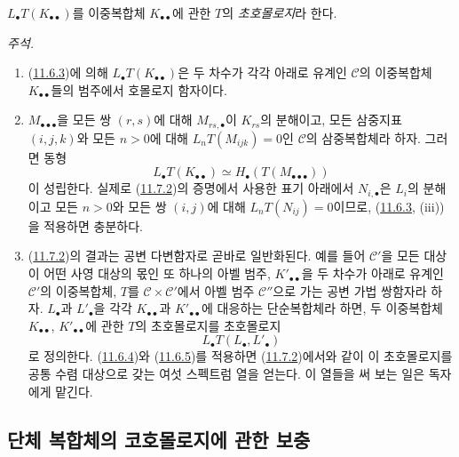 $L_\bullet T(K_{\bullet\bullet})$를 이중복합체
$K_{\bullet\bullet}$에 관한 $T$의 \emph{초호몰로지}라 한다.

\begin{env}[11.7.3]
\label{0.11.7.3-fr}
\emph{주석.}
\begin{enumerate}
\item[\rm(i)]
(\hyperref[0.11.6.3-fr]{11.6.3})에 의해
$L_\bullet T(K_{\bullet\bullet})$은 두 차수가 각각 아래로 유계인
$\mathcal C$의 이중복합체 $K_{\bullet\bullet}$들의 범주에서
호몰로지 함자이다.


\item[\rm(ii)]
$M_{\bullet\bullet\bullet}$을 모든 쌍 $(r,s)$에 대해
$M_{rs,\bullet}$이 $K_{rs}$의 분해이고, 모든 삼중지표 $(i,j,k)$와
모든 $n>0$에 대해 $L_nT(M_{ijk})=0$인 $\mathcal C$의
삼중복합체라 하자. 그러면 동형
\[
L_\bullet T(K_{\bullet\bullet})
\simeq H_\bullet(T(M_{\bullet\bullet\bullet}))
\]
이 성립한다. 실제로 (\hyperref[0.11.7.2-fr]{11.7.2})의 증명에서
사용한 표기 아래에서 $N_{i,\bullet}$은 $L_i$의 분해이고 모든
$n>0$와 모든 쌍 $(i,j)$에 대해 $L_nT(N_{ij})=0$이므로,
(\hyperref[0.11.6.3-fr]{11.6.3}, (iii))을 적용하면 충분하다.

\item[\rm(iii)]
(\hyperref[0.11.7.2-fr]{11.7.2})의 결과는 공변 다변함자로 곧바로
일반화된다. 예를 들어 $\mathcal C'$을 모든 대상이 어떤 사영 대상의
몫인 또 하나의 아벨 범주, $K'_{\bullet\bullet}$을 두 차수가 아래로
유계인 $\mathcal C'$의 이중복합체, $T$를
$\mathcal C\times\mathcal C'$에서 아벨 범주 $\mathcal C''$으로
가는 공변 가법 쌍함자라 하자. $L_\bullet$과 $L'_\bullet$을 각각
$K_{\bullet\bullet}$과 $K'_{\bullet\bullet}$에 대응하는
단순복합체라 하면, 두 이중복합체 $K_{\bullet\bullet}$,
$K'_{\bullet\bullet}$에 관한 $T$의 초호몰로지를 초호몰로지
\[
L_\bullet T(L_\bullet,L'_\bullet)
\]
로 정의한다. (\hyperref[0.11.6.4-fr]{11.6.4})와
(\hyperref[0.11.6.5-fr]{11.6.5})를 적용하면
(\hyperref[0.11.7.2-fr]{11.7.2})에서와 같이 이 초호몰로지를 공통
수렴 대상으로 갖는 여섯 스펙트럼 열을 얻는다. 이 열들을 써 보는
일은 독자에게 맡긴다.
\end{enumerate}
\end{env}

\subsection{단체 복합체의 코호몰로지에 관한 보충}
\label{subsection:0.11.8-fr}

